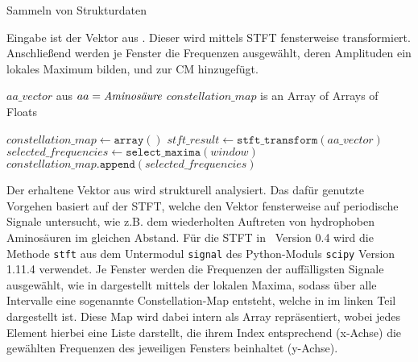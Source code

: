        \begin{algorithm}[H]
            \caption{Sammeln von Strukturdaten}\label{alg:strukturdaten}
            Eingabe ist der Vektor aus . Dieser wird mittels \acs{STFT} fensterweise transformiert. Anschließend werden je Fenster die Frequenzen ausgewählt, deren Amplituden ein lokales Maximum bilden, und zur \acl{CM} hinzugefügt.
            \begin{algorithmic}[1]
                \Require $aa\_vector$ aus  \Comment $aa = \emph{Aminosäure}$
                \Ensure $constellation\_map$ is an Array of Arrays of Floats

                \State $constellation\_map \gets \texttt{array}()$
                \State $stft\_result \gets \texttt{stft\_transform}(aa\_vector)$
                    \State $selected\_frequencies \gets \texttt{select\_maxima}(window)$
                    \State $constellation\_map.\texttt{append}(selected\_frequencies)$
                \EndFor
            \end{algorithmic}
        \end{algorithm}
        Der erhaltene Vektor aus  wird strukturell analysiert. Das dafür genutzte Vorgehen basiert auf der \ac{STFT}, welche den Vektor fensterweise auf periodische Signale untersucht, wie z.B. dem wiederholten Auftreten von hydrophoben Aminosäuren im gleichen Abstand. Für die \ac{STFT} in \protfin\ Version 0.4 wird die Methode \texttt{stft} aus dem Untermodul \texttt{signal} des Python-Moduls \texttt{scipy} \autocite{scipy} Version 1.11.4 verwendet. Je Fenster werden die Frequenzen der auffälligsten Signale ausgewählt, wie in  dargestellt mittels der lokalen Maxima, sodass über alle Intervalle eine sogenannte Constellation-Map entsteht, welche in  im linken Teil dargestellt ist.
        Diese Map wird dabei intern als Array repräsentiert, wobei jedes Element hierbei eine Liste darstellt, die ihrem Index entsprechend (x-Achse) die gewählten Frequenzen des jeweiligen Fensters beinhaltet (y-Achse).

